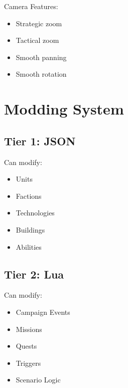\documentclass[11pt,a4paper]{article}
\begin{document}
Camera Features:

\begin{itemize}

    \item Strategic zoom

    \item Tactical zoom

    \item Smooth panning

    \item Smooth rotation

\end{itemize}

\section{Modding System}

\subsection{Tier 1: JSON}

Can modify:

\begin{itemize}

    \item Units

    \item Factions

    \item Technologies

    \item Buildings

    \item Abilities

\end{itemize}

\subsection{Tier 2: Lua}

Can modify:

\begin{itemize}

    \item Campaign Events

    \item Missions

    \item Quests

    \item Triggers

    \item Scenario Logic

\end{itemize}
\end{document}
